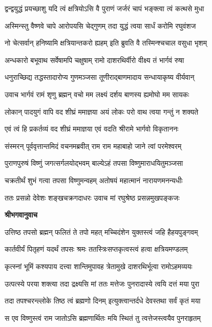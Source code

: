 \twolineshloka
{द्वन्द्वयुद्धं प्रयच्छाशु यदि त्वं क्षत्रियोऽसि वै}
{पुराणं जर्जरं चापं भङ्क्त्वा त्वं कत्थसे मुधा} %

\twolineshloka
{अस्मिन्स्तु वैष्णवे चापे आरोपयसि चेद्गुणम्}
{तदा युद्धं त्वया सार्धं करोमि रघुवंशज} %

\twolineshloka
{नो चेत्सर्वान् हनिष्यामि क्षत्रियान्तकरो ह्यहम्}
{इति ब्रुवति वै तस्मिन्श्चचाल वसुधा भृशम्} %

\twolineshloka
{अन्धकारो बभूवाथ सर्वेषामपि चक्षुषाम्}
{रामो दाशरथिर्वीरो वीक्ष्य तं भार्गवं रुषा} %

\twolineshloka
{धनुराच्छिद्य तद्धस्तादारोप्य गुणमञ्जसा}
{तूणीराद्बाणमादाय सन्धायाकृष्य वीर्यवान्} %

\twolineshloka
{उवाच भार्गवं रामं शृणु ब्रह्मन् वचो मम}
{लक्ष्यं दर्शय बाणस्य ह्यमोघो मम सायकः} %

\twolineshloka
{लोकान् पादयुगं वापि वद शीघ्रं ममाज्ञया}
{अयं लोकः परो वाथ त्वया गन्तुं न शक्यते} %

\twolineshloka
{एवं त्वं हि प्रकर्तव्यं वद शीघ्रं ममाज्ञया}
{एवं वदति श्रीरामे भार्गवो विकृताननः} %

\twolineshloka
{संस्मरन् पूर्ववृत्तान्तमिदं वचनमब्रवीत्}
{राम राम महाबाहो जाने त्वां परमेश्वरम्} %

\twolineshloka
{पुराणपुरुषं विष्णुं जगत्सर्गलयोद्भवम्}
{बाल्येऽहं तपसा विष्णुमाराधयितुमञ्जसा} %

\twolineshloka
{चक्रतीर्थं शुभं गत्वा तपसा विष्णुमन्वहम्}
{अतोषयं महात्मानं नारायणमनन्यधीः} %

\twolineshloka
{ततः प्रसन्नो देवेशः शङ्खचक्रगदाधरः}
{उवाच मां रघुश्रेष्ठ प्रसन्नमुखपङ्कजः} %

\textbf{श्रीभगवानुवाच}

\twolineshloka
{उत्तिष्ठ तपसो ब्रह्मन् फलितं ते तपो महत्}
{मच्चिदंशेन युक्तस्त्वं जहि हैहयपुङ्गवम्} %

\twolineshloka
{कार्तवीर्यं पितृहणं यदर्थं तपसः श्रमः}
{ततस्त्रिःसप्तकृत्वस्त्वं हत्वा क्षत्रियमण्डलम्} %

\twolineshloka
{कृत्स्नां भूमिं कश्यपाय दत्त्वा शान्तिमुपावह}
{त्रेतामुखे दाशरथिर्भूत्वा रामोऽहमव्ययः} %

\twolineshloka
{उत्पत्स्ये परया शक्त्या तदा द्रक्ष्यसि मां ततः}
{मत्तेजः पुनरादास्ये त्वयि दत्तं मया पुरा} %

\twolineshloka
{तदा तपश्चरन्ल्लोके तिष्ठ त्वं ब्रह्मणो दिनम्}
{इत्युक्त्वान्तर्दधे देवस्तथा सर्वं कृतं मया} %

\twolineshloka
{स एव विष्णुस्त्वं राम जातोऽसि ब्रह्मणार्थितः}
{मयि स्थितं तु त्वत्तेजस्त्वयैव पुनराहृतम्} %

